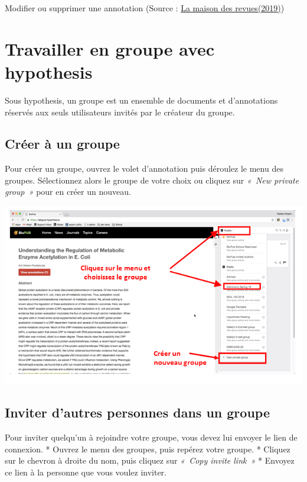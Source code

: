 \documentclass[
]{book}
\begin{document}
Modifier ou supprimer une annotation (Source : \href{http://www.maisondesrevues.org/1182}{La maison des revues(2019)})

\hypertarget{s6}{%
\chapter{Travailler en groupe avec hypothesis}\label{s6}}

Sous hypothesis, un groupe est un ensemble de documents et d'annotations réservés aux seuls utilisateurs invités par le créateur du groupe.

\hypertarget{s61}{%
\section{Créer à un groupe}\label{s61}}

Pour créer un groupe, ouvrez le volet d'annotation puis déroulez le menu des groupes. Sélectionnez alors le groupe de votre choix ou cliquez sur \emph{«~New private group~»} pour en créer un nouveau.

\includegraphics{img/groupes.png}

\hypertarget{s62}{%
\section{Inviter d'autres personnes dans un groupe}\label{s62}}

Pour inviter quelqu'un à rejoindre votre groupe, vous devez lui envoyer le lien de connexion.
* Ouvrez le menu des groupes, puis repérez votre groupe.
* Cliquez sur le chevron à droite du nom, puis cliquez sur \emph{«~Copy invite link~»}
* Envoyez ce lien à la personne que vous voulez inviter.
\end{document}
